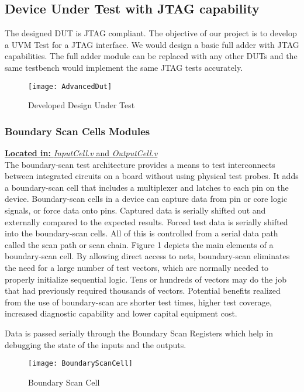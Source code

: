 \documentclass[a4paper,11pt]{article}
\begin{document}
\subsection{Device Under Test with JTAG capability}
The designed DUT is JTAG compliant. The objective of our project is to develop a UVM Test for a JTAG interface. We would design a basic full adder with JTAG capabilities. The full adder module can be replaced with any other DUTs and the same testbench would implement the same JTAG tests accurately.

\begin{figure}[ht]
\centering
\texttt{[image: AdvancedDut]}
\caption{Developed Design Under Test}
\end{figure}

\FloatBarrier
\subsubsection{Boundary Scan Cells Modules}
\underline{\textbf{Located in:} \textit{InputCell.v} and \textit{OutputCell.v}}\\

The boundary-scan test architecture provides a means to test interconnects between integrated circuits on a board without using physical test probes. It adds a boundary-scan cell that includes a multiplexer and latches to each pin on the device. Boundary-scan cells in a device can capture data from pin or core logic signals, or force data onto pins. Captured data is serially shifted out and externally compared to the expected results. Forced test data is serially shifted into the boundary-scan cells. All of this is controlled from a serial data path called the scan path or scan chain. Figure 1 depicts the main elements of a boundary-scan cell. By allowing direct access to nets, boundary-scan eliminates the need for a large number of test vectors, which are normally needed to properly initialize sequential logic. Tens or hundreds of vectors may do the job that had previously required thousands of vectors. Potential benefits realized from the use of boundary-scan are shorter test times, higher test coverage, increased diagnostic capability and lower capital equipment cost.

Data is passed serially through the Boundary Scan Registers which help in debugging the state of the inputs and the outputs.

\begin{figure}[ht]
\centering
\texttt{[image: BoundaryScanCell]}
\caption{Boundary Scan Cell}
\end{figure}
\end{document}
